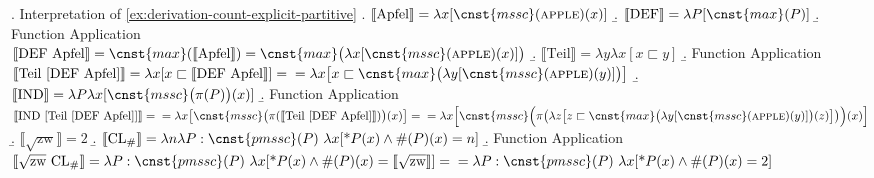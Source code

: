 	\ex. Interpretation of \ref{ex:derivation-count-explicit-partitive}\label{ex:derivation-count-explicit-partitive-interpretation}
	\a. $\llbracket \text{Apfel}\rrbracket = \lambda x [\cnst{mssc}(\textsc{apple})(x)]$\label{ex:derivation-count-explicit-partitive-interpretation-a}
	\b. $\llbracket \text{DEF}\rrbracket = \lambda P [\cnst{max}(P)]$\label{ex:derivation-count-explicit-partitive-interpretation-b}
	\b. Function Application\\
	$\llbracket \text{DEF Apfel}\rrbracket = \cnst{max}(\llbracket \text{Apfel}\rrbracket) = \cnst{max}\big(\lambda x [\cnst{mssc}(\textsc{apple})(x)]\big)$\label{ex:derivation-count-explicit-partitive-interpretation-c}
	\b. $\llbracket \text{Teil}\rrbracket = \lambda y \lambda x [x \sqsubset y]$\label{ex:derivation-count-explicit-partitive-interpretation-d}
	\b. Function Application\\
	$\llbracket \text{Teil [DEF Apfel]}\rrbracket = \lambda x [x \sqsubset \llbracket \text{DEF Apfel}\rrbracket] =\\
	=\lambda x \big[x \sqsubset \cnst{max}\big(\lambda y [\cnst{mssc}(\textsc{apple})(y)]\big)\big]$\label{ex:derivation-count-explicit-partitive-interpretation-e}
	\b. $\llbracket \text{IND}\rrbracket = \lambda P \lambda x[\cnst{mssc}\big(\pi(P)\big)(x)]$\label{ex:derivation-count-explicit-partitive-interpretation-f}
	\b. Function Application\\
	$\llbracket \text{IND [Teil [DEF Apfel]]}\rrbracket = \\
    = \lambda x\big[\cnst{mssc}\big(\pi(\llbracket \text{Teil [DEF Apfel]}\rrbracket)\big)(x)\big] = \\
	= \lambda x\Big[\cnst{mssc}\Big(\pi\big(\lambda z\big[z \sqsubset \cnst{max}\big(\lambda y [\cnst{mssc}(\textsc{apple})(y)]\big)(z)\big]\big)\Big)(x)\Big]$\label{ex:derivation-count-explicit-partitive-interpretation-g}
	\b. $\llbracket \text{$\sqrt{\text{zw}}$}\rrbracket = 2$\label{ex:derivation-count-explicit-partitive-interpretation-h}
	\b. $\llbracket \text{CL$_\#$}\rrbracket = \lambda n \lambda P : \cnst{pmssc}(P)\ \lambda x [\text{*}P(x) \wedge \#(P)(x) = n]$\label{ex:derivation-count-explicit-partitive-interpretation-i}
	\b. Function Application\\
	$\llbracket \text{$\sqrt{\text{zw}}$ CL$_\#$}\rrbracket = \lambda P : \cnst{pmssc}(P)\ \lambda x [\text{*}P(x) \wedge \#(P)(x) = \llbracket \text{$\sqrt{\text{zw}}$}\rrbracket] = \\
    = \lambda P : \cnst{pmssc}(P)\ \lambda x [\text{*}P(x) \wedge \#(P)(x) = 2]$\label{ex:derivation-count-explicit-partitive-interpretation-j}
